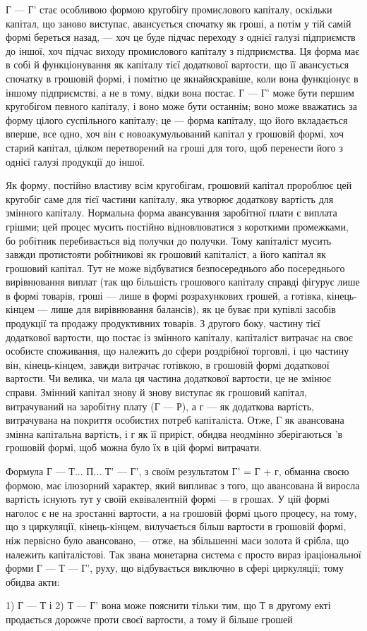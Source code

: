 Г — Г' стає особливою формою кругобігу промислового капіталу,
оскільки капітал, що заново виступає, авансується спочатку як гроші, а потім
у тій самій формі береться назад, — хоч це буде підчас переходу з однієї
галузі підприємств до іншої, хоч підчас виходу промислового капіталу
з підприємства. Ця форма має в собі й функціонування як капіталу
тієї додаткової вартости, що її авансується спочатку в грошовій формі,
і помітно це якнайяскравіше, коли вона функціонує в іншому підприємстві,
а не в тому, відки вона постає. Г — Г' може бути першим кругобігом
певного капіталу, і воно може бути останнім; воно може вважатись за
форму цілого суспільного капіталу; це — форма капіталу, що його вкладається
вперше, все одно, хоч він є новоакумульований капітал у грошовій
формі, хоч старий капітал, цілком перетворений на гроші для того,
щоб перенести його з однієї галузі продукції до іншої.

Як форму, постійно властиву всім кругобігам, грошовий капітал пророблює
цей кругобіг саме для тієї частини капіталу, яка утворює додаткову
вартість для змінного капіталу. Нормальна форма авансування
заробітної плати є виплата грішми; цей процес мусить постійно відновлюватися
з короткими промежками, бо робітник перебивається від
получки до получки. Тому капіталіст мусить завжди протистояти робітникові
як грошовий капіталіст, а його капітал як грошовий капітал. Тут
не може відбуватися безпосереднього або посереднього вирівнювання
виплат (так що більшість грошового капіталу справді фігурує лише
в формі товарів, гроші — лише в формі розрахункових грошей, а готівка,
кінець-кінцем — лише для вирівнювання балансів), як це буває при купівлі
засобів продукції та продажу продуктивних товарів. З другого боку,
частину тієї додаткової вартости, що постає із змінного капіталу, капіталіст
витрачає на своє особисте споживання, що належить до сфери
роздрібної торговлі, і цю частину він, кінець-кінцем, завжди витрачає
готівкою, в грошовій формі додаткової вартости. Чи велика, чи мала ця
частина додаткової вартости, це не змінює справи. Змінний капітал
знову й знову виступає як грошовий капітал, витрачуваний на заробітну
плату (Г — Р), а г — як додаткова вартість, витрачувана на покриття
особистих потреб капіталіста. Отже, Г як авансована змінна капітальна
вартість, і г як її приріст, обидва неодмінно зберігаються 'в грошовій
формі, щоб можна було їх в цій формі витрачати.

Формула Г — Т... П... Т' — Г', з своїм результатом Г' = Г + г, обманна
своєю формою, має ілюзорний характер, який випливає з того, що
авансована й виросла вартість існують тут у своїй еквівалентній формі — в грошах. У цій формі
наголос є не на зростанні вартости, а на
грошовій формі цього процесу, на тому, що з циркуляції, кінець-кінцем,
вилучається більш вартости в грошовій формі, ніж первісно було авансовано, — отже, на збільшенні
маси золота й срібла, що належить капіталістові.
Так звана монетарна система є просто вираз іраціональної форми Г — Т — Г',
руху, що відбувається виключно в сфері циркуляції; тому обидва акти:

1) Г — Т і 2) Т — Г' вона може пояснити тільки тим, що Т в другому
екті продається дорожче проти своєї вартости, а тому й більше грошей
